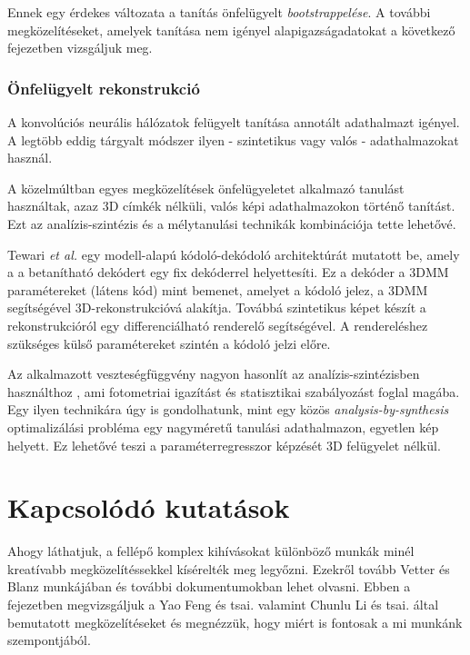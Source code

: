\documentclass[12pt,a4]{article}
\begin{document}
	Ennek egy érdekes változata
	a tanítás önfelügyelt \textit{bootstrappelése}. A további megközelítéseket, amelyek tanítása nem igényel
	alapigazságadatokat a következő fejezetben vizsgáljuk meg.
	
	\subsubsection{Önfelügyelt rekonstrukció}
	A konvolúciós neurális hálózatok felügyelt tanítása annotált adathalmazt igényel. A legtöbb
	eddig tárgyalt módszer ilyen - szintetikus vagy valós - adathalmazokat használ.
	
	\cite{3dmm}
	A közelmúltban egyes megközelítések önfelügyeletet alkalmazó
	tanulást használtak, azaz 3D címkék nélküli, valós képi adathalmazokon történő tanítást.
	Ezt az analízis-szintézis és a mélytanulási technikák kombinációja tette lehetővé.
	
	
	Tewari \textit{et al.} \cite{tewari} egy modell-alapú kódoló-dekódoló architektúrát mutatott be, amely a
	a betanítható dekódert egy fix dekóderrel helyettesíti. Ez a dekóder a 3DMM paramétereket (látens kód)
	mint bemenet, amelyet a kódoló jelez, a 3DMM segítségével 3D-rekonstrukcióvá alakítja.
	Továbbá szintetikus képet készít a rekonstrukcióról egy differenciálható renderelő segítségével.
	A rendereléshez szükséges külső paramétereket szintén a kódoló jelzi előre. 
	
	
	Az alkalmazott veszteségfüggvény nagyon hasonlít az analízis-szintézisben használthoz \cite{3dmm}, ami fotometriai igazítást és statisztikai szabályozást foglal magába. Egy ilyen technikára úgy is gondolhatunk, mint egy közös
	\textit{analysis-by-synthesis} optimalizálási probléma egy nagyméretű tanulási
	adathalmazon, egyetlen kép helyett. Ez lehetővé teszi a paraméterregresszor képzését 3D felügyelet nélkül.
    
    \section{Kapcsolódó kutatások}

        Ahogy láthatjuk, a fellépő komplex kihívásokat különböző munkák minél kreatívabb megközelítéssekkel kísérelték meg legyőzni. Ezekről tovább \cite{blanzvetter}Vetter és Blanz  munkájában és további dokumentumokban lehet olvasni. Ebben a fejezetben megvizsgáljuk a \cite{deca}Yao Feng és tsai. valamint \cite{focus}Chunlu Li és tsai. által bemutatott megközelítéseket és megnézzük, hogy miért is fontosak a mi munkánk szempontjából.
\end{document}
